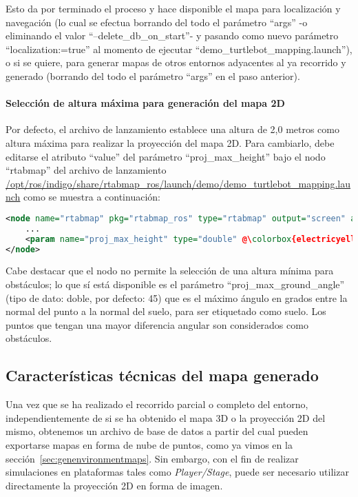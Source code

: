 Esto da por terminado el proceso y hace disponible el mapa para localización y navegación (lo cual se efectua borrando del todo el parámetro ``args'' -o eliminando el valor ``--delete\_db\_on\_start''- y pasando como nuevo parámetro ``localization:=true'' al momento de ejecutar ``demo\_turtlebot\_mapping.launch''), o si se quiere, para generar mapas de otros entornos adyacentes al ya recorrido y generado (borrando del todo el parámetro ``args'' en el paso anterior).

\paragraph{Selección de altura máxima para generación del mapa 2D}

Por defecto, el archivo de lanzamiento establece una altura de 2,0 metros como altura máxima para realizar la proyección del mapa 2D. Para cambiarlo, debe editarse el atributo ``value'' del parámetro ``proj\_max\_height'' bajo el nodo ``rtabmap'' del archivo de lanzamiento \url{/opt/ros/indigo/share/rtabmap_ros/launch/demo/demo_turtlebot_mapping.launch} como se muestra a continuación:

\begin{blackcodebox}
\begin{lstlisting}[escapechar=@, language=xml]
<node name="rtabmap" pkg="rtabmap_ros" type="rtabmap" output="screen" args="$(arg args)">
    ...
    <param name="proj_max_height" type="double" @\colorbox{electricyellow}{value=``2.0''}@ />
</node>
\end{lstlisting}
\end{blackcodebox}

Cabe destacar que el nodo no permite la selección de una altura mínima para obstáculos; lo que sí está disponible es el parámetro ``proj\_max\_ground\_angle'' (tipo de dato: doble, por defecto: 45) que es el máximo ángulo en grados entre la normal del punto a la normal del suelo, para ser etiquetado como suelo. Los puntos que tengan una mayor diferencia angular son considerados como obstáculos.

\subsection{Características técnicas del mapa generado}

Una vez que se ha realizado el recorrido parcial o completo del entorno, independientemente de si se ha obtenido el mapa 3D o la proyección 2D del mismo, obtenemos un archivo de base de datos a partir del cual pueden exportarse mapas en forma de nube de puntos, como ya vimos en la sección~\ref{sec:genenvironmentmaps}. Sin embargo, con el fin de realizar simulaciones en plataformas tales como \textit{Player/Stage}, puede ser necesario utilizar directamente la proyección 2D en forma de imagen.

